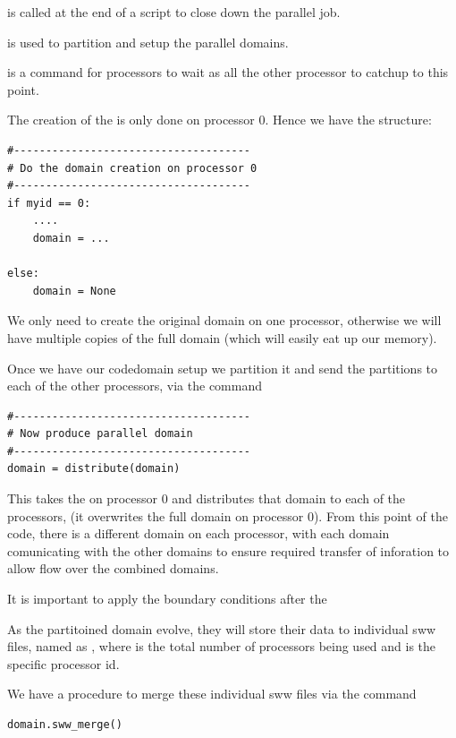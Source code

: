 \documentclass{manual}
\begin{document}
 is called at the end of a script to close down the parallel job.

 is used to partition and setup the parallel domains.

 is a command for processors to wait as all the other processor to catchup to this point.




The creation of the  is only done on processor 0. Hence we have the structure:

\begin{verbatim}
#-------------------------------------
# Do the domain creation on processor 0
#-------------------------------------
if myid == 0: 
    ....
    domain = ...
	
else:
    domain = None
\end{verbatim}

We only need to create the original domain on one processor, otherwise we will have multiple copies of the full domain (which will easily eat up our memory). 

Once we have our code{domain} setup we partition it and send the partitions to each of the other processors, via the command

\begin{verbatim}
#-------------------------------------
# Now produce parallel domain
#-------------------------------------
domain = distribute(domain)
\end{verbatim}

This takes the  on processor 0 and distributes that domain to each of the processors, (it overwrites the full domain on processor 0).  From this point of the code, there is a different domain on each processor, with each domain comunicating with the other domains to ensure required transfer of inforation to allow flow over the combined domains. 

It is important to apply the boundary conditions after the 



As the partitoined domain evolve, they will store their data to individual sww files, named as , where  is the total number of processors being used and  is the specific processor id. 

We have a procedure to merge these individual sww files via the command 

\begin{verbatim}
domain.sww_merge()
\end{verbatim}
\end{document}
